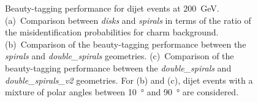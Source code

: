 \begin{figure}[htbp]
\begin{subfigure}[b]{0.33\textwidth}
    \caption{}
    \label{fig:doubleSpirals_doubleSpirals}
  \end{subfigure}
  \caption{Beauty-tagging performance for dijet events at
    \SI{200}{\giga\electronvolt}. (a)~Comparison between \emph{disks}
    and \emph{spirals} in terms of the ratio of the misidentification
    probabilities for charm background. (b)~Comparison of the
    beauty-tagging performance between the \emph{spirals} and
    \emph{double\_spirals} geometries. (c)~Comparison of the
    beauty-tagging performance between the \emph{double\_spirals} and
    \emph{double\_spirals\_v2} geometries. For (b) and (c), dijet
    events with a mixture of polar angles between \SI{10}{\degree} and
    \SI{90}{\degree} are considered.}
  \label{fig:performance}
\end{figure}


